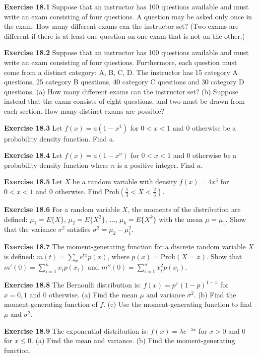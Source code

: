 \begin{original}
\textbf{Exercise 18.1} Suppose that an instructor has 100 questions available and must write an exam consisting of four questions. A question may be asked only once in the exam. How many different exams can the instructor set? (Two exams are different if there is at least one question on one exam that is not on the other.)

\textbf{Exercise 18.2} Suppose that an instructor has 100 questions available and must write an exam consisting of four questions. Furthermore, each question must come from a distinct category: A, B, C, D. The instructor has 15 category A questions, 25 category B questions, 40 category C questions and 30 category D questions.
(a) How many different exams can the instructor set?
(b) Suppose instead that the exam consists of eight questions, and two must be drawn from each section. How many distinct exams are possible?

\textbf{Exercise 18.3} Let $f(x) = a(1 - x^4)$ for $0 < x < 1$ and $0$ otherwise be a probability density function. Find $a$.

\textbf{Exercise 18.4} Let $f(x) = a(1 - x^n)$ for $0 < x < 1$ and $0$ otherwise be a probability density function where $n$ is a positive integer. Find $a$.

\textbf{Exercise 18.5} Let $X$ be a random variable with density $f(x) = 4x^3$ for $0 < x < 1$ and $0$ otherwise. Find $\text{Prob}(\frac{1}{3} < X < \frac{2}{3})$.

\textbf{Exercise 18.6} For a random variable $X$, the moments of the distribution are defined: $\mu_1 = E\{X\}$, $\mu_2 = E\{X^2\}$, $\ldots$, $\mu_k = E\{X^k\}$ with the mean $\mu = \mu_1$. Show that the variance $\sigma^2$ satisfies $\sigma^2 = \mu_2 - \mu_1^2$.

\textbf{Exercise 18.7} The moment-generating function for a discrete random variable $X$ is defined: $m(t) = \sum_x e^{tx} p(x)$, where $p(x) = \text{Prob}(X = x)$. Show that $m'(0) = \sum_{i=1}^{n} x_i p(x_i)$ and $m''(0) = \sum_{i=1}^{n} x_i^2 p(x_i)$.

\textbf{Exercise 18.8} The Bernoulli distribution is: $f(x) = p^x(1-p)^{1-x}$ for $x = 0, 1$ and $0$ otherwise.
(a) Find the mean $\mu$ and variance $\sigma^2$.
(b) Find the moment-generating function of $f$.
(c) Use the moment-generating function to find $\mu$ and $\sigma^2$.

\textbf{Exercise 18.9} The exponential distribution is: $f(x) = \lambda e^{-\lambda x}$ for $x > 0$ and $0$ for $x \leq 0$.
(a) Find the mean and variance.
(b) Find the moment-generating function.


\end{original}
